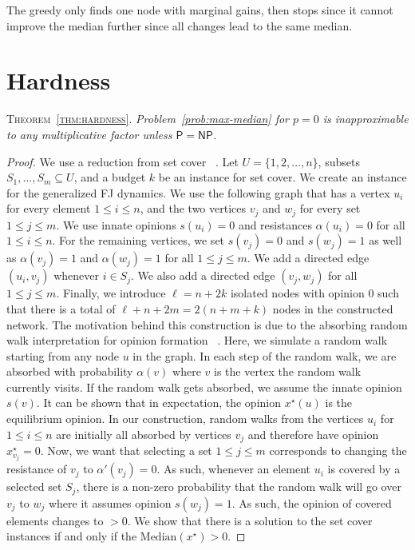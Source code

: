 The greedy only finds one node with marginal gains, then stops since it cannot improve the median further since all changes lead to the same median.

\section{Hardness}

\textsc{Theorem~\ref{thm:hardness}}.
\emph{Problem~\ref{prob:max-median}
for $p=0$
is inapproximable
to any multiplicative factor
unless $\mathsf{P} = \mathsf{NP}$.}


\begin{proof}
We use a reduction from set cover
~\cite{williamsonbook}.
Let $U = \{1, 2, \dots, n\}$,
subsets $S_1, \dots, S_m \subseteq U$,
and a budget $k$ be
an instance for set cover.
We create an instance for
the generalized FJ dynamics.
We use the following graph
that has a vertex $u_i$ for every
element $1 \le i \le n$,
and the two vertices $v_j$ and $w_j$
for every set $1 \le j \le m$.
We use innate opinions $s(u_i) = 0$
and resistances $\alpha(u_i) = 0$
for all $1 \le i \le n$. For the
remaining vertices, we set
$s(v_j) = 0$ and $s(w_j) = 1$
as well as $\alpha(v_j) = 1$
and $\alpha(w_j) = 1$
for all $1 \le j \le m$.
We add a directed edge $(u_i, v_j)$
whenever $i \in S_j$.
We also add a directed edge $(v_j, w_j)$
for all $1 \le j \le m$.
Finally, we introduce $\ell = n + 2k$
isolated nodes with opinion $0$ such
that there is a total of $\ell+n+2m = 2(n+m+k)$
nodes in the constructed network.
%
The motivation behind this construction
is due to the absorbing random walk
interpretation for opinion formation
~\cite{gionis2013opinion}. Here, we
simulate a random walk starting from
any node $u$ in the graph.
In each step of the random walk,
we are absorbed with probability
$\alpha(v)$ where $v$ is the vertex
the random walk currently visits. If the
random walk gets absorbed, we assume
the innate opinion $s(v)$. It can be
shown that in expectation, the opinion
$x^\star(u)$ is the
equilibrium opinion.
%
In our construction, random walks
from the vertices $u_i$ for $1 \le i \le n$
are initially all absorbed by
vertices $v_j$ and therefore have
opinion $x^\star_{v_j} = 0$. Now,
we want that selecting a
set $1 \le j \le m$ corresponds to changing
the resistance of $v_j$ to $\alpha'(v_j) = 0$.
As such, whenever an element $u_i$ is
covered by a selected set $S_j$, there is a
non-zero probability that the random
walk will go over $v_j$ to $w_j$ where
it assumes opinion $s(w_j) = 1$.
As such, the opinion of covered elements
changes to $>0$.
%
We show that there is a solution
to the set cover instances if
and only if the $\mathrm{Median}(x^\star) > 0$.


\end{proof}
